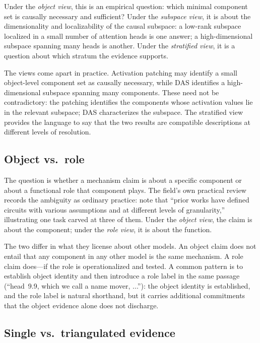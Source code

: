 \documentclass{article}
\begin{document}
Under the \emph{object view}, this is an empirical question: which
minimal component set is causally necessary and sufficient?  Under
the \emph{subspace view}, it is about the dimensionality and
localizability of the causal subspace: a low-rank subspace localized
in a small number of attention heads is one answer; a high-dimensional
subspace spanning many heads is another.  Under the \emph{stratified
view}, it is a question about which stratum the evidence supports.

The views come apart in practice.  Activation patching may identify a
small object-level component set as causally necessary, while DAS
identifies a high-dimensional subspace spanning many components.  These
need not be contradictory: the patching identifies the components whose
activation values lie in the relevant subspace; DAS characterizes the
subspace.  The stratified view provides the language to say that the
two results are compatible descriptions at different levels of
resolution.

\subsection{Object vs.\ role}

The question is whether a mechanism claim is about a specific component
or about a functional role that component plays.  The field's own practical
review records the ambiguity as ordinary practice: \citet{rai2024} note that
``prior works have defined circuits with various assumptions and at different
levels of granularity,'' illustrating one task carved at three of them.  Under the \emph{object
view}, the claim is about the component; under the \emph{role view},
it is about the function.

The two differ in what they license about other models.  An object claim does not
entail that any component in any other model is the same mechanism.  A
role claim does---if the role is operationalized and tested.  A common pattern is to establish object identity and then introduce a
role label in the same passage (``head~9.9, which we call a name
mover, ...''): the object identity is established, and the role label
is natural shorthand, but it carries additional commitments that the
object evidence alone does not discharge.

\subsection{Single vs.\ triangulated evidence}
\end{document}
